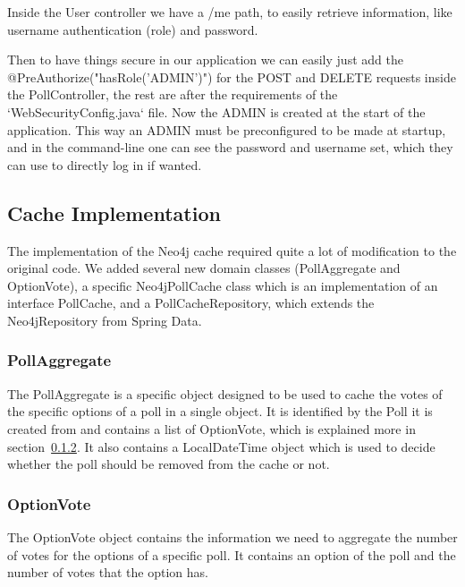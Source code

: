 Inside the User controller we have a /me path, to easily retrieve information, like username authentication (role) and password. 

Then to have things secure in our application we can easily just add the 	@PreAuthorize("hasRole('ADMIN')") for the POST and DELETE requests inside the PollController, the rest are after the requirements of the `WebSecurityConfig.java` file.
Now the ADMIN is created at the start of the application.
This way an ADMIN must be preconfigured to be made at startup, and in the command-line one can see the password and username set, which they can use to directly log in if wanted.




\subsection{Cache Implementation}

The implementation of the Neo4j cache required quite a lot of modification to the original code. We added several new domain classes (PollAggregate and OptionVote), a specific Neo4jPollCache class which is an implementation of an interface PollCache, and a PollCacheRepository, which extends the Neo4jRepository from Spring Data.

\subsubsection{PollAggregate}
The PollAggregate is a specific object designed to be used to cache the votes of the specific options of a poll in a single object. It is identified by the Poll it is created from and contains a list of OptionVote, which is explained more in section~\ref{sec:OptionVote}. It also contains a LocalDateTime object which is used to decide whether the poll should be removed from the cache or not.

\subsubsection{OptionVote}
\label{sec:OptionVote}
The OptionVote object contains the information we need to aggregate the number of votes for the options of a specific poll. It contains an option of the poll and the number of votes that the option has. 

